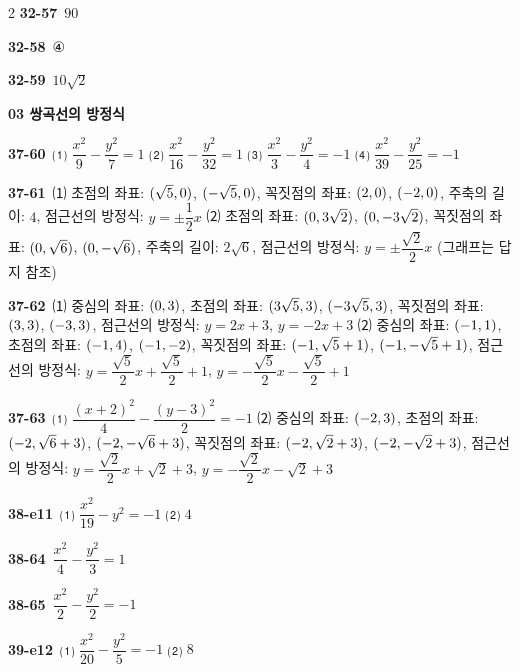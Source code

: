 \documentclass[10pt,a4paper]{article}
\begin{document}
\begin{multicols}{2}
\noindent\textbf{32-57}\ $90$\par
\noindent\textbf{32-58}\ ④\par
\noindent\textbf{32-59}\ $10\sqrt{2}$\par
\noindent\textbf{03 쌍곡선의 방정식}\par\smallskip
\noindent\textbf{37-60}\ ⑴ $\dfrac{x^2}{9}-\dfrac{y^2}{7}=1$ ⑵ $\dfrac{x^2}{16}-\dfrac{y^2}{32}=1$ ⑶ $\dfrac{x^2}{3}-\dfrac{y^2}{4}=-1$ ⑷ $\dfrac{x^2}{39}-\dfrac{y^2}{25}=-1$\par
\noindent\textbf{37-61}\ ⑴ 초점의 좌표: $(\sqrt{5}{,}\mkern3mu\mathopen{}0)$, $(-\sqrt{5}{,}\mkern3mu\mathopen{}0)$, 꼭짓점의 좌표: $(2{,}\mkern3mu\mathopen{}0)$, $(-2{,}\mkern3mu\mathopen{}0)$, 주축의 길이: $4$, 점근선의 방정식: $y=\pm\dfrac{1}{2}x$ ⑵ 초점의 좌표: $(0{,}\mkern3mu\mathopen{}3\sqrt{2})$, $(0{,}\mkern3mu\mathopen{}-3\sqrt{2})$, 꼭짓점의 좌표: $(0{,}\mkern3mu\mathopen{}\sqrt{6})$, $(0{,}\mkern3mu\mathopen{}-\sqrt{6})$, 주축의 길이: $2\sqrt{6}$, 점근선의 방정식: $y=\pm\dfrac{\sqrt{2}}{2}x$ (그래프는 답지 참조)\par
\noindent\textbf{37-62}\ ⑴ 중심의 좌표: $(0{,}\mkern3mu\mathopen{}3)$, 초점의 좌표: $(3\sqrt{5}{,}\mkern3mu\mathopen{}3)$, $(-3\sqrt{5}{,}\mkern3mu\mathopen{}3)$, 꼭짓점의 좌표: $(3{,}\mkern3mu\mathopen{}3)$, $(-3{,}\mkern3mu\mathopen{}3)$, 점근선의 방정식: $y=2x+3$, $y=-2x+3$ ⑵ 중심의 좌표: $(-1{,}\mkern3mu\mathopen{}1)$, 초점의 좌표: $(-1{,}\mkern3mu\mathopen{}4)$, $(-1{,}\mkern3mu\mathopen{}-2)$, 꼭짓점의 좌표: $(-1{,}\mkern3mu\mathopen{}\sqrt{5}+1)$, $(-1{,}\mkern3mu\mathopen{}-\sqrt{5}+1)$, 점근선의 방정식: $y=\dfrac{\sqrt{5}}{2}x+\dfrac{\sqrt{5}}{2}+1$, $y=-\dfrac{\sqrt{5}}{2}x-\dfrac{\sqrt{5}}{2}+1$\par
\noindent\textbf{37-63}\ ⑴ $\dfrac{(x+2)^2}{4}-\dfrac{(y-3)^2}{2}=-1$ ⑵ 중심의 좌표: $(-2{,}\mkern3mu\mathopen{}3)$, 초점의 좌표: $(-2{,}\mkern3mu\mathopen{}\sqrt{6}+3)$, $(-2{,}\mkern3mu\mathopen{}-\sqrt{6}+3)$, 꼭짓점의 좌표: $(-2{,}\mkern3mu\mathopen{}\sqrt{2}+3)$, $(-2{,}\mkern3mu\mathopen{}-\sqrt{2}+3)$, 점근선의 방정식: $y=\dfrac{\sqrt{2}}{2}x+\sqrt{2}+3$, $y=-\dfrac{\sqrt{2}}{2}x-\sqrt{2}+3$\par
\noindent\textbf{38-e11}\ ⑴ $\dfrac{x^2}{19}-y^2=-1$ ⑵ $4$\par
\noindent\textbf{38-64}\ $\dfrac{x^2}{4}-\dfrac{y^2}{3}=1$\par
\noindent\textbf{38-65}\ $\dfrac{x^2}{2}-\dfrac{y^2}{2}=-1$\par
\noindent\textbf{39-e12}\ ⑴ $\dfrac{x^2}{20}-\dfrac{y^2}{5}=-1$ ⑵ $8$\par

\end{multicols}
\end{document}
